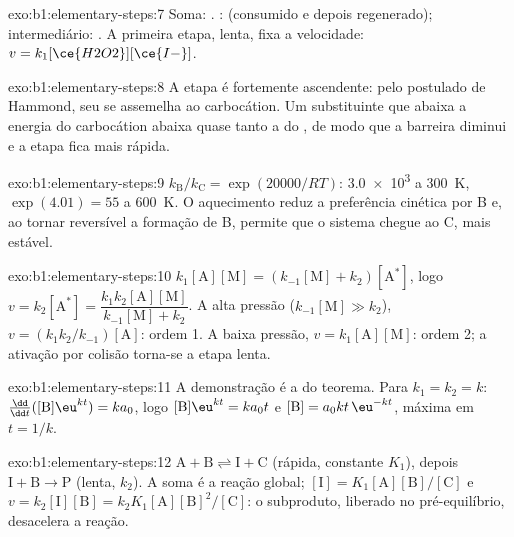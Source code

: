 \begin{solution}{exo:b1:elementary-steps:7}
Soma: . :  (consumido e depois
regenerado); intermediário: . A primeira etapa, lenta, fixa a
velocidade: $v = k_1[\ce{H2O2}][\ce{I-}]$.
\end{solution}

\begin{solution}{exo:b1:elementary-steps:8}
A etapa é fortemente ascendente: pelo postulado de Hammond, seu  se assemelha ao carbocátion. Um substituinte que abaixa a
energia do carbocátion abaixa quase tanto a do , de
modo que a barreira diminui e a etapa fica mais rápida.
\end{solution}

\begin{solution}{exo:b1:elementary-steps:9}
$k_{\mathrm B}/k_{\mathrm C} = \exp(20000/RT)$: \num{3.0e3} a \qty{300}{K},
$\exp(4.01) = 55$ a \qty{600}{K}. O aquecimento reduz a preferência
cinética por B e, ao tornar reversível a formação de B, permite que o
sistema chegue ao C, mais estável.
\end{solution}

\begin{solution}{exo:b1:elementary-steps:10}
$k_1[\mathrm{A}][\mathrm{M}] = (k_{-1}[\mathrm{M}] + k_2)[\mathrm{A}^*]$,
logo $v = k_2[\mathrm{A}^*] = \dfrac{k_1k_2[\mathrm{A}][\mathrm{M}]}{k_{-1}[\mathrm{M}]
+ k_2}$. A alta pressão ($k_{-1}[\mathrm{M}] \gg k_2$), $v =
(k_1k_2/k_{-1})[\mathrm{A}]$: ordem 1. A baixa pressão, $v =
k_1[\mathrm{A}][\mathrm{M}]$: ordem 2; a ativação por colisão torna-se a
etapa lenta.
\end{solution}

\begin{solution}{exo:b1:elementary-steps:11}
A demonstração é a do teorema. Para $k_1 = k_2 = k$:
$\frac{\dd}{\dd t}([\mathrm{B}]\eu^{kt}) = ka_0$, logo $[\mathrm{B}]\eu^{kt} =
ka_0t$ e $[\mathrm{B}] = a_0kt\,\eu^{-kt}$, máxima em $t = 1/k$.
\end{solution}

\begin{solution}{exo:b1:elementary-steps:12}
$\mathrm{A} + \mathrm{B} \rightleftharpoons \mathrm{I} + \mathrm{C}$ (rápida,
constante $K_1$), depois $\mathrm{I} + \mathrm{B} \to \mathrm{P}$ (lenta,
$k_2$). A soma é a reação global; $[\mathrm{I}] =
K_1[\mathrm{A}][\mathrm{B}]/[\mathrm{C}]$ e $v = k_2[\mathrm{I}][\mathrm{B}]
= k_2K_1[\mathrm{A}][\mathrm{B}]^2/[\mathrm{C}]$: o subproduto, liberado
no pré-equilíbrio, desacelera a reação.
\end{solution}

